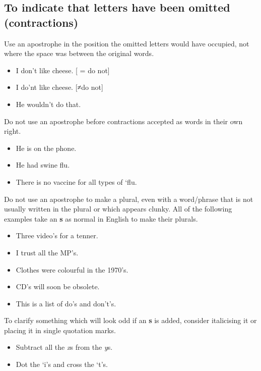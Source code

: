 \documentclass[11pt,a4paper]{book}
\newcommand{\xmark}{{\color{cadmiumred}\ding{54}}}%
\newcommand{\cmark}{{\color{green(html/cssgreen)}\checkmark}}%
\begin{document}
			\subsection{To indicate that letters have been omitted (contractions)}
			Use an apostrophe in the position the omitted letters would have occupied, not where the space was between the original words.
			{\firasans \begin{mdframed}[backgroundcolor=aliceblue] \begin{itemize}[label=\cmark]
				\item I don't like cheese. [ = do not]
				\item[\xmark] I do'nt like cheese. [≠do not]
				\item He wouldn't do that.
			\end{itemize} \end{mdframed} }
			Do not use an apostrophe before contractions accepted as words in their own right.
			{\firasans \begin{mdframed}[backgroundcolor=aliceblue] \begin{itemize}[label=\cmark]
				\item He is on the phone.
				\item He had swine flu.
				\item[\xmark] There is no vaccine for all types of `flu.
			\end{itemize} \end{mdframed} }
			Do not use an apostrophe to make a plural, even with a word/phrase that is not usually written in the plural or which appears clunky. All of the following examples take an \textbf{s} as normal in English to make their plurals.
			{\firasans \begin{mdframed}[backgroundcolor=aliceblue] \begin{itemize}[label=\cmark]
				\item[\xmark] Three video's for a tenner.
				\item[\xmark] I trust all the MP's.
				\item[\xmark] Clothes were colourful in the 1970's.
				\item[\xmark] CD's will soon be obsolete.
				\item[\xmark] This is a list of do's and don't's.
			\end{itemize} \end{mdframed} }
			To clarify something which will look odd if an \textbf{s} is added, consider italicising it or placing it in single quotation marks.
			{\firasans \begin{mdframed}[backgroundcolor=aliceblue] \begin{itemize}[label=\cmark]
				\item Subtract all the \textit{x}s from the \textit{y}s.
				\item Dot the `i's and cross the `t's.
			\end{itemize} \end{mdframed} }
\end{document}
